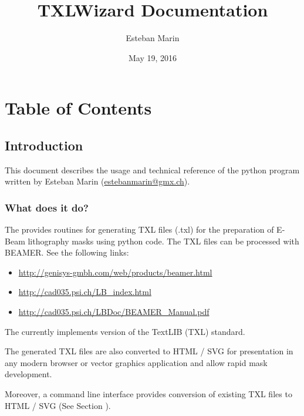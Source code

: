 \documentclass[letterpaper,10pt,english]{sphinxmanual}
\title{TXLWizard Documentation}
\date{May 19, 2016}
\author{Esteban Marin}
\begin{document}
\maketitle
\tableofcontents
{}\label{index::doc}



\chapter{Table of Contents}
\label{index:table-of-contents}\label{index:welcome-to-txlwriter-s-documentation}

\section{Introduction}
\label{Chapters/10_Introduction:introduction}\label{Chapters/10_Introduction::doc}
This document describes the usage and technical reference of the python program 
written by Esteban Marin (\href{mailto:estebanmarin@gmx.ch}{estebanmarin@gmx.ch}).


\subsection{What does it do?}
\label{Chapters/10_Introduction:what-does-it-do}
The  provides routines for generating TXL files (.txl) for
the preparation of E-Beam lithography masks using python code. The TXL files can be processed with BEAMER.
See the following links:
\begin{itemize}
\item {} 
\url{http://genisys-gmbh.com/web/products/beamer.html}

\item {} 
\url{http://cad035.psi.ch/LB\_index.html}

\item {} 
\url{http://cad035.psi.ch/LBDoc/BEAMER\_Manual.pdf}

\end{itemize}

The  currently implements version  of the TextLIB (TXL) standard.

The generated TXL files are also converted to HTML / SVG for presentation in any modern browser or
vector graphics application and allow rapid mask development.

Moreover, a command line interface  provides conversion of existing TXL files to HTML / SVG
(See Section {\hyperref[Chapters/30_TXLConverter:sec\string-txlconverter]{}}).
\end{document}
